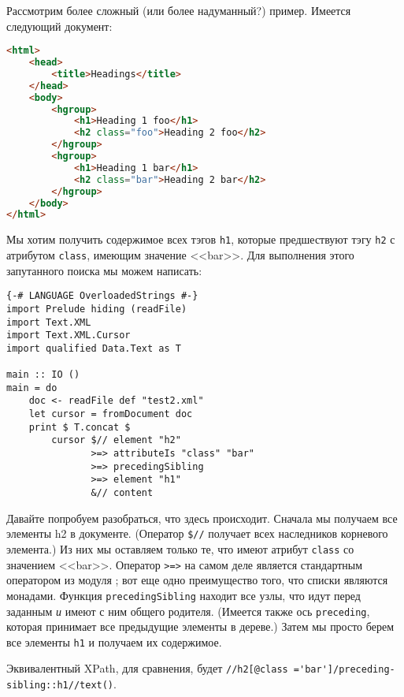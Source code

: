 Рассмотрим более сложный (или более надуманный?) пример. Имеется следующий документ:

\begin{lstlisting}[language=HTML]
<html>
    <head>
        <title>Headings</title>
    </head>
    <body>
        <hgroup>
            <h1>Heading 1 foo</h1>
            <h2 class="foo">Heading 2 foo</h2>
        </hgroup>
        <hgroup>
            <h1>Heading 1 bar</h1>
            <h2 class="bar">Heading 2 bar</h2>
        </hgroup>
    </body>
</html>
\end{lstlisting}

Мы хотим получить содержимое всех тэгов \lstinline!h1!, которые предшествуют тэгу \lstinline!h2! с атрибутом \lstinline!class!, имеющим значение <<bar>>. Для выполнения этого запутанного поиска мы можем написать:

\begin{lstlisting}
{-# LANGUAGE OverloadedStrings #-}
import Prelude hiding (readFile)
import Text.XML
import Text.XML.Cursor
import qualified Data.Text as T

main :: IO ()
main = do
    doc <- readFile def "test2.xml"
    let cursor = fromDocument doc
    print $ T.concat $
        cursor $// element "h2"
               >=> attributeIs "class" "bar"
               >=> precedingSibling
               >=> element "h1"
               &// content
\end{lstlisting}%

Давайте попробуем разобраться, что здесь происходит. Сначала мы получаем все элементы h2 в документе. (Оператор \lstinline!$//! получает всех наследников корневого элемента.) Из них мы оставляем только те, что имеют атрибут \lstinline!class! со значением <<bar>>. Оператор \lstinline!>=>! на самом деле является стандартным оператором из модуля ; вот еще одно преимущество того, что списки являются монадами. Функция \lstinline!precedingSibling! находит все узлы, что идут перед заданным \emph{и} имеют с ним общего родителя. (Имеется также ось \lstinline!preceding!, которая принимает все предыдущие элементы в дереве.) Затем мы просто берем все элементы \lstinline!h1! и получаем их содержимое.

\begin{remark}
Эквивалентный XPath, для сравнения, будет \lstinline!//h2[@class ='bar']/preceding-sibling::h1//text()!.
\end{remark}

